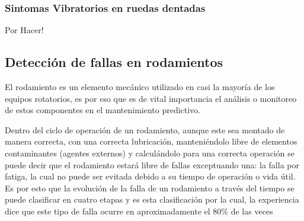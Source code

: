  				\subsubsection{Sintomas Vibratorios en ruedas dentadas}
 					Por Hacer!
 			\subsection{Detección de fallas en rodamientos}
 				El rodamiento es un elemento mecánico utilizado en casi la mayoría de los equipos rotatorios, es por eso que es de vital importancia el análisis o monitoreo de estos componentes en el mantenimiento predictivo.
 				
 				Dentro del ciclo de operación de un rodamiento, aunque este sea montado de manera correcta, con una correcta lubricación, manteniéndolo libre de elementos contaminantes (agentes externos) y calculándolo para una correcta operación se puede decir que el rodamiento estará libre de fallas exceptuando una: la falla por fatiga, la cual no puede ser evitada debido a su tiempo de operación o vida útil. Es por esto que la evolución de la falla de un rodamiento a través del tiempo se puede clasificar en cuatro etapas y es esta clasificación por la cual, la experiencia dice que este tipo de falla ocurre en aproximadamente el $80\%$ de las veces
